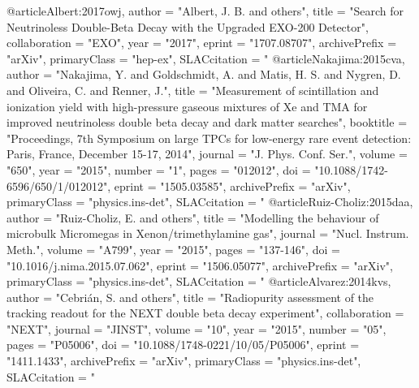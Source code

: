 {{{@article{Albert:2017owj,
      author         = "Albert, J. B. and others",
      title          = "{Search for Neutrinoless Double-Beta Decay with the
                        Upgraded EXO-200 Detector}",
      collaboration  = "EXO",
      year           = "2017",
      eprint         = "1707.08707",
      archivePrefix  = "arXiv",
      primaryClass   = "hep-ex",
      SLACcitation   = "%
}
@article{Nakajima:2015cva,
      author         = "Nakajima, Y. and Goldschmidt, A. and Matis, H. S. and
                        Nygren, D. and Oliveira, C. and Renner, J.",
      title          = "{Measurement of scintillation and ionization yield with
                        high-pressure gaseous mixtures of Xe and TMA for improved
                        neutrinoless double beta decay and dark matter searches}",
      booktitle      = "{Proceedings, 7th Symposium on large TPCs for low-energy
                        rare event detection: Paris, France, December 15-17,
                        2014}",
      journal        = "J. Phys. Conf. Ser.",
      volume         = "650",
      year           = "2015",
      number         = "1",
      pages          = "012012",
      doi            = "10.1088/1742-6596/650/1/012012",
      eprint         = "1505.03585",
      archivePrefix  = "arXiv",
      primaryClass   = "physics.ins-det",
      SLACcitation   = "%
}
@article{Ruiz-Choliz:2015daa,
      author         = "Ruiz-Choliz, E. and others",
      title          = "{Modelling the behaviour of microbulk Micromegas in
                        Xenon/trimethylamine gas}",
      journal        = "Nucl. Instrum. Meth.",
      volume         = "A799",
      year           = "2015",
      pages          = "137-146",
      doi            = "10.1016/j.nima.2015.07.062",
      eprint         = "1506.05077",
      archivePrefix  = "arXiv",
      primaryClass   = "physics.ins-det",
      SLACcitation   = "%
}
@article{Alvarez:2014kvs,
      author         = "Cebri\'an, S. and others",
      title          = "{Radiopurity assessment of the tracking readout for the
                        NEXT double beta decay experiment}",
      collaboration  = "NEXT",
      journal        = "JINST",
      volume         = "10",
      year           = "2015",
      number         = "05",
      pages          = "P05006",
      doi            = "10.1088/1748-0221/10/05/P05006",
      eprint         = "1411.1433",
      archivePrefix  = "arXiv",
      primaryClass   = "physics.ins-det",
      SLACcitation   = "%
}}}}
